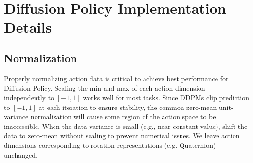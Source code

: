\section{Diffusion Policy Implementation Details}

\subsection{Normalization}
Properly normalizing action data is critical to achieve best performance for Diffusion Policy. 
Scaling the min and max of each action dimension independently to $[-1,1]$ works well for most tasks. 
Since DDPMs clip prediction to $[-1,1]$ at each iteration to ensure stability, the common zero-mean unit-variance normalization will cause some region of the action space to be inaccessible. 
When the data variance is small (e.g., near constant value), shift the data to zero-mean without scaling to prevent numerical issues.
We leave action dimensions corresponding to rotation representations (e.g. Quaternion) unchanged.



